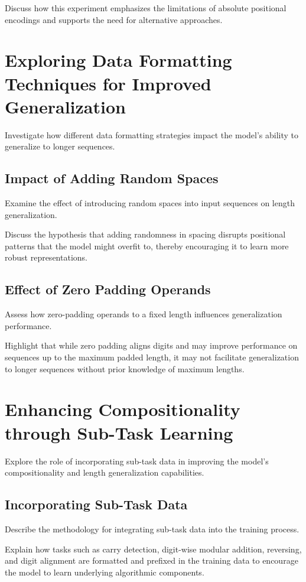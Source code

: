 Discuss how this experiment emphasizes the limitations of absolute positional encodings and supports the need for alternative approaches.

\section{Exploring Data Formatting Techniques for Improved Generalization}
\label{sec:data_formatting_improvement}
Investigate how different data formatting strategies impact the model's ability to generalize to longer sequences.

\subsection{Impact of Adding Random Spaces}
Examine the effect of introducing random spaces into input sequences on length generalization.

Discuss the hypothesis that adding randomness in spacing disrupts positional patterns that the model might overfit to, thereby encouraging it to learn more robust representations.

\subsection{Effect of Zero Padding Operands}
Assess how zero-padding operands to a fixed length influences generalization performance.

Highlight that while zero padding aligns digits and may improve performance on sequences up to the maximum padded length, it may not facilitate generalization to longer sequences without prior knowledge of maximum lengths.

\section{Enhancing Compositionality through Sub-Task Learning}
\label{sec:subtask_learning}
Explore the role of incorporating sub-task data in improving the model's compositionality and length generalization capabilities.

\subsection{Incorporating Sub-Task Data}
Describe the methodology for integrating sub-task data into the training process.

Explain how tasks such as carry detection, digit-wise modular addition, reversing, and digit alignment are formatted and prefixed in the training data to encourage the model to learn underlying algorithmic components.

